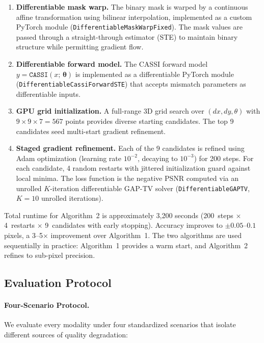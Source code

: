 \begin{sloppypar}
\begin{enumerate}
  \item \textbf{Differentiable mask warp.}  The binary mask is warped by a
    continuous affine transformation using bilinear interpolation,
    implemented as a custom PyTorch module
    (\texttt{DifferentiableMaskWarpFixed}).  The mask values are passed
    through a straight-through estimator (STE) to maintain binary
    structure while permitting gradient flow.
  \item \textbf{Differentiable forward model.}  The CASSI forward model
    $y = \texttt{CASSI}(x;\, \boldsymbol{\theta})$ is implemented as a
    differentiable PyTorch module (\texttt{DifferentiableCassiForwardSTE})
    that accepts mismatch parameters as differentiable inputs.
  \item \textbf{GPU grid initialization.}  A full-range 3D grid search
    over $(dx, dy, \theta)$ with $9 \times 9 \times 7 = 567$ points
    provides diverse starting candidates.  The top 9 candidates seed
    multi-start gradient refinement.
  \item \textbf{Staged gradient refinement.}  Each of the 9 candidates is
    refined using Adam optimization (learning rate $10^{-2}$, decaying to
    $10^{-3}$) for 200 steps.  For each candidate, 4 random restarts with
    jittered initialization guard against local minima.  The loss function
    is the negative PSNR computed via an unrolled $K$-iteration
    differentiable GAP-TV solver (\texttt{DifferentiableGAPTV}, $K=10$
    unrolled iterations).
\end{enumerate}
\end{sloppypar}

Total runtime for Algorithm~2 is approximately 3,200 seconds
(200~steps $\times$ 4~restarts $\times$ 9~candidates with early stopping).
Accuracy improves to $\pm 0.05$--$0.1$ pixels, a 3--5$\times$ improvement
over Algorithm~1.  The two algorithms are used sequentially in practice:
Algorithm~1 provides a warm start, and Algorithm~2 refines to sub-pixel
precision.


\subsection*{Evaluation Protocol}
\label{sec:methods:eval}

\paragraph{Four-Scenario Protocol.}
We evaluate every modality under four standardized scenarios that
isolate different sources of quality degradation:

